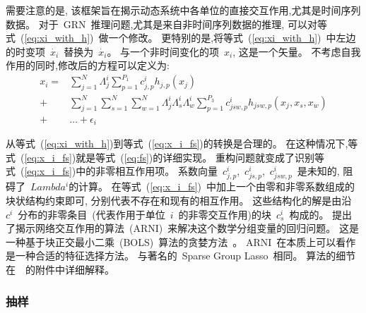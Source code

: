 需要注意的是, 该框架旨在揭示动态系统中各单位的直接交互作用,尤其是时间序列数据。
对于~GRN~推理问题,尤其是来自非时间序列数据的推理,
可以对等式~(\ref{eq:xi_with_h})~做一个修改。
更特别的是,将等式~(\ref{eq:xi_with_h})~中左边的时变项~$\dot{x_i}$~替换为~$\dot{x_i}$。
与一个非时间变化的项~$x_i$, 这是一个矢量。
不考虑自我作用的同时,修改后的方程可以定义为:
\begin{equation}
\label{eq:x_i_fs}
\begin{split}
   x_i = &\sum_{j=1}^{N} \Lambda^i_{j} \sum_{p=1}^{P_1} c^i_{j,p}h_{j,p}(x_j)\\  
       + &\sum_{j=1}^{N} \sum_{s=1}^{N} \sum_{w=1}^{N}\Lambda^i_{j}\Lambda^i_{s}\Lambda^i_{w} \sum_{p=1}^{P_3} c^i_{jsw,p}h_{jsw,p}(x_j,x_s,x_w)\\
       +&\ldots + \epsilon_{i}
   \end{split}
\end{equation}

从等式~(\ref{eq:xi_with_h})到等式~(\ref{eq:x_i_fs})的转换是合理的。
在这种情况下,等式~(\ref{eq:x_i_fs})就是等式~(\ref{eq:fs})的详细实现。
重构问题就变成了识别等式~(\ref{eq:x_i_fs})中的非零相互作用项。
系数向量~$c^i_{j,p}$,~$c^i_{js,p}$,~$c^i_{jsw,p}$~是未知的,
阻碍了~$Lambda^i$的计算。
在等式~(\ref{eq:x_i_fs})~中加上一个由零和非零系数组成的块状结构约束即可,
分别代表不存在和现有的相互作用。
这些结构化的解是由沿~$c^i$~分布的非零条目~(代表作用于单位~$i$~的非零交互作用)的块~$c^i_s$~构成的。
提出了揭示网络交互作用的算法~(ARNI)~来解决这个数学分组变量的回归问题。
这是一种基于块正交最小二乘~(BOLS)~算法的贪婪方法~\cite{majumdar2009fast}。
ARNI~在本质上可以看作是一种合适的特征选择方法。
与著名的~Sparse Group Lasso~\cite{friedman2010note}相同。
算法的细节在~\cite{casadiego2017model}~的附件中详细解释。

\subsubsection{抽样}

